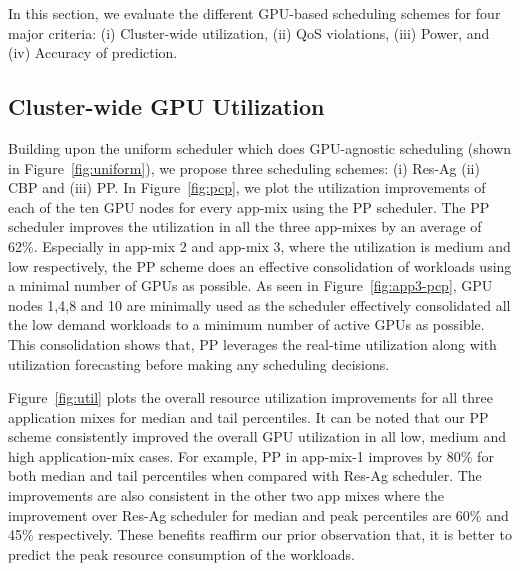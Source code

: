 



In this section, we evaluate the different GPU-based scheduling schemes for four major criteria: (i) Cluster-wide utilization, (ii) QoS violations, (iii) Power, and (iv) Accuracy of prediction.


\subsection{Cluster-wide GPU Utilization}
Building upon the uniform scheduler which does GPU-agnostic scheduling (shown in Figure~\ref{fig:uniform}), we propose three scheduling schemes: (i) Res-Ag (ii) CBP and (iii) PP. In Figure~\ref{fig:pcp}, we plot the  utilization improvements of each of the ten GPU nodes for every app-mix using the PP scheduler. The PP scheduler improves the utilization in all the three app-mixes by an average of 62\%. Especially in app-mix 2 and app-mix 3, where the utilization is medium and low respectively, the PP scheme does an effective consolidation of workloads using a minimal number of GPUs as possible. As seen in Figure~\ref{fig:app3-pcp}, GPU nodes 1,4,8 and 10 are minimally used as the scheduler effectively consolidated all the low demand workloads to a minimum number of active GPUs as possible. This consolidation shows that, PP leverages the real-time utilization along with utilization forecasting before making any scheduling decisions. 

Figure~\ref{fig:util} plots the overall resource utilization improvements for all three application mixes for median and tail percentiles. It can be noted that our PP scheme consistently improved the overall GPU utilization in all low, medium and high application-mix cases. For example, PP in app-mix-1 improves by 80\% for both median and tail percentiles when compared with Res-Ag scheduler. The improvements are also consistent in the other two app mixes where the improvement over Res-Ag scheduler for median and peak percentiles are 60\% and  45\% respectively. These benefits reaffirm our prior observation that, it is better to predict the peak resource consumption of the workloads.

